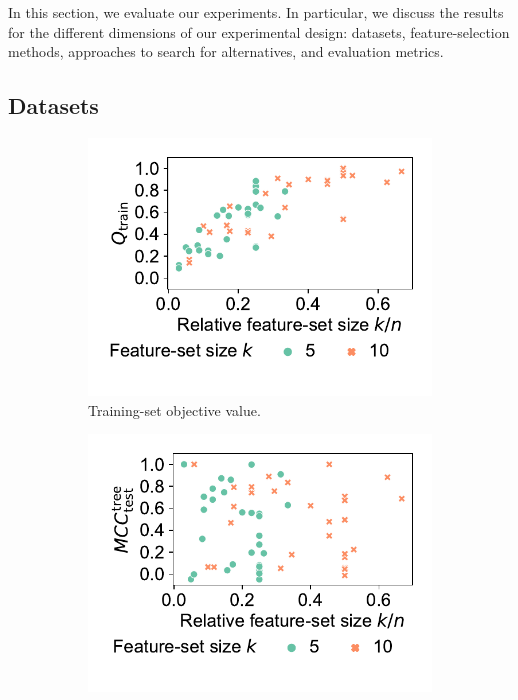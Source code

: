 \documentclass{article}
\theoremstyle{definition}
\begin{document}
In this section, we evaluate our experiments.
In particular, we discuss the results for the different dimensions of our experimental design:
datasets, feature-selection methods, approaches to search for alternatives, and evaluation metrics.

\subsection{Datasets}
\label{sec:afs:evaluation:datasets}

\begin{figure}[htb]
	\centering
	\begin{subfigure}[t]{0.48\textwidth}
		\centering
		\includegraphics[width=\textwidth, trim=15 30 15 15, clip]{plots/impact-dataset-k-train-objective.pdf}
		\caption{Training-set objective value.}
		\label{fig:afs:impact-dataset-k-train-objective}
	\end{subfigure}
	\hfill
	\begin{subfigure}[t]{0.48\textwidth}
		\centering
		\includegraphics[width=\textwidth, trim=15 30 15 15, clip]{plots/impact-dataset-k-decision-tree-test-mcc.pdf}

\end{subfigure}
\end{figure}
\end{document}
